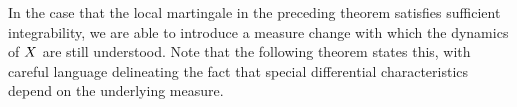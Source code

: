 



In the case that the local martingale in the preceding theorem satisfies sufficient integrability, we are able to introduce a measure change with which the dynamics of $X$ are still understood.
Note that the following theorem states this, with careful language delineating the fact that special differential characteristics depend on the underlying measure.


